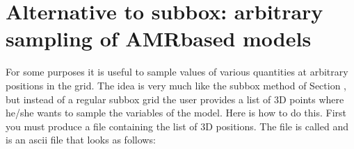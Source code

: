 \documentclass[letterpaper,10pt,english]{sphinxmanual}
\begin{document}
\section{Alternative to subbox: arbitrary sampling of AMR\sphinxhyphen{}based models}
\label{\detokenize{toolsinside:alternative-to-subbox-arbitrary-sampling-of-amr-based-models}}\label{\detokenize{toolsinside:sec-sampling}}
For some purposes it is useful to sample values of various quantities at
arbitrary positions in the grid. The idea is very much like the subbox
method of Section {\hyperref[\detokenize{toolsinside:sec-subbox}]{}}, but instead of a regular subbox grid
the user provides a list of 3\sphinxhyphen{}D points where he/she wants to sample the
variables of the model. Here is how to do this. First you must produce
a file containing the list of 3\sphinxhyphen{}D positions. The file is called
 and is an ascii file that looks as
follows:

\begin{sphinxVerbatim}[commandchars=\\\{\}]
                                      
                                           
\PYG{p}{[}\PYG{p}{]}  \PYG{p}{[}\PYG{p}{]}  \PYG{p}{[}\PYG{p}{]}                        
\PYG{p}{[}\PYG{p}{]}  \PYG{p}{[}\PYG{p}{]}  \PYG{p}{[}\PYG{p}{]}                        
\PYG{p}{[}\PYG{p}{]}  \PYG{p}{[}\PYG{p}{]}  \PYG{p}{[}\PYG{p}{]}                        
\end{sphinxVerbatim}
\end{document}
